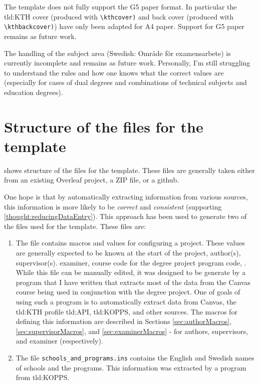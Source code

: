 The template does not fully support the G5 paper format. In particular the \gls{tld:KTH} cover (produced with \texttt{\textbackslash kthcover)} and back cover (produced with \texttt{\textbackslash kthbackcover)}) have only been adapted for A4 paper. Support for G5 paper remains as future work.

The handling of the subject area (Swedish: Område för examensarbete) is currently incomplete and remains as future work. Personally, I'm still struggling to understand the rules and how one knows what the correct values are (especially for cases of \first dual degrees and \Second combinations of technical subjects and education degrees).

\section{Structure of the files for the template}
 shows structure of the files for the template. These files are generally taken either from an existing Overleaf project, a ZIP file, or a github.

One hope is that by automatically extracting information from various sources, this information is more likely to be \textit{correct} and \textit{consistent} (supporting \ref{thought:reducingDataEntry}). This approach has been used to generate two of the files used for the template. These files are:
\begin{enumerate}
    \item The file  contains macros and values for configuring a project. These values are generally expected to be known at the start of the project, \eg author(s), supervisor(s). examiner, course code for the degree project program code, \etc. While this file can be manually edited, it was designed to be generate by a program that I have written that extracts most of the data from the Canvas course being used in conjunction with the degree project. One of goals of using such a program is to automatically extract data from Canvas, the \gls{tld:KTH} profile \gls{tld:API}, \gls{tld:KOPPS}, and other sources. The macros for defining this information are described in Sections \ref{sec:authorMacros}, \ref{sec:supervisorMacros}, and \ref{sec:examinerMacros} - for authors, supervisors, and examiner (respectively).

    \item The file \texttt{schools\_and\_programs.ins} contains the English and Swedish names of schools and the programs. This information was extracted by a program from \gls{tld:KOPPS}.
\end{enumerate}

